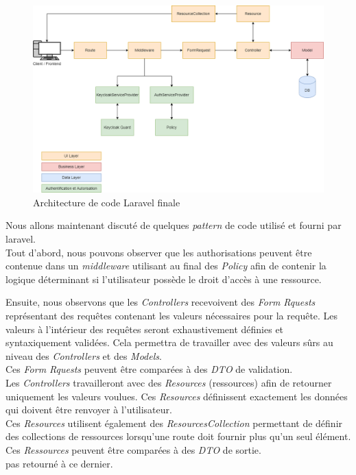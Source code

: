 \documentclass[
    iai, %
    il, %
]{heig-tb}
\begin{document}
\begin{center}
    \begin{figure}[H]
        \includegraphics[width=\textwidth]{./assets/figures/architecture-code-finale.drawio.png}
        \caption{Architecture de code Laravel finale \label{architecture-code-finale}}
    \end{figure}
\end{center}

Nous allons maintenant discuté de quelques \emph{pattern} de code utilisé et fourni par \Gls{laravel}.\\
Tout d'abord, nous pouvons observer que les authorisations peuvent être contenue dans un \emph{middleware} utilisant au final des \emph{Policy} afin de contenir la logique déterminant si l'utilisateur possède le droit d'accès à une ressource.

Ensuite, nous observons que les \emph{Controllers} recevoivent des \emph{Form Rquests} représentant des requêtes contenant les valeurs nécessaires pour la requête. Les valeurs à l'intérieur des requêtes seront exhaustivement définies et syntaxiquement validées. Cela permettra de travailler avec des valeurs sûrs au niveau des \emph{Controllers} et des \emph{Models}. \\
Ces \emph{Form Rquests} peuvent être comparées à des \emph{DTO} de validation. \\

Les \emph{Controllers} travailleront avec des \emph{Resources} (ressources) afin de retourner uniquement les valeurs voulues. Ces \emph{Resources} définissent exactement les données qui doivent être renvoyer à l'utilisateur. \\
Ces \emph{Resources} utilisent également des \emph{ResourcesCollection} permettant de
définir des collections de ressources lorsqu'une route doit fournir plus qu'un seul élément. \\
Ces \emph{Ressources} peuvent être comparées à des \emph{DTO} de sortie. \\
pas retourné à ce dernier. \\
\end{document}
